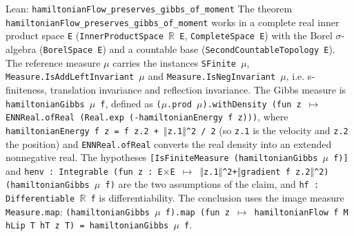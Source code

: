 \documentclass[11pt,a4paper]{article}
\begin{document}
\begin{leanbox}{Lean: \texttt{hamiltonianFlow\_\allowbreak{}preserves\_\allowbreak{}gibbs\_\allowbreak{}of\_\allowbreak{}moment}}
The theorem \texttt{hamiltonian\allowbreak{}Flow\_\allowbreak{}preserves\_\allowbreak{}gibbs\_\allowbreak{}of\_\allowbreak{}moment} works in a complete real inner product space \texttt{E} (\texttt{Inner\allowbreak{}Product\allowbreak{}Space \ensuremath{\mathbb R} E}, \texttt{Complete\allowbreak{}Space E}) with the Borel \ensuremath{\sigma}-algebra (\texttt{Borel\allowbreak{}Space E}) and a countable base (\texttt{Second\allowbreak{}Countable\allowbreak{}Topology E}). The reference measure \texttt{\ensuremath{\mu}} carries the instances \texttt{SFinite \ensuremath{\mu}}, \texttt{Measure.\allowbreak{}Is\allowbreak{}Add\allowbreak{}Left\allowbreak{}Invariant \ensuremath{\mu}} and \texttt{Measure.\allowbreak{}Is\allowbreak{}Neg\allowbreak{}Invariant \ensuremath{\mu}}, i.e. s-finiteness, translation invariance and reflection invariance. The Gibbs measure is \texttt{hamiltonian\allowbreak{}Gibbs \ensuremath{\mu} f}, defined as \texttt{(\ensuremath{\mu}.\allowbreak{}prod \ensuremath{\mu}).\allowbreak{}with\allowbreak{}Density (fun z \ensuremath{\mapsto} ENNReal.\allowbreak{}of\allowbreak{}Real (Real.\allowbreak{}exp (-\allowbreak{}hamiltonian\allowbreak{}Energy f z)))}, where \texttt{hamiltonian\allowbreak{}Energy f z = f z.\allowbreak{}2 + \ensuremath{\Vert}z.\allowbreak{}1\ensuremath{\Vert}\textasciicircum{}2 /\allowbreak{} 2} (so \texttt{z.\allowbreak{}1} is the velocity and \texttt{z.\allowbreak{}2} the position) and \texttt{ENNReal.\allowbreak{}of\allowbreak{}Real} converts the real density into an extended nonnegative real. The hypotheses \texttt{[Is\allowbreak{}Finite\allowbreak{}Measure (hamiltonian\allowbreak{}Gibbs \ensuremath{\mu} f)]} and \texttt{henv : Integrable (fun z : E\ensuremath{\times}E \ensuremath{\mapsto} \ensuremath{\Vert}z.\allowbreak{}1\ensuremath{\Vert}\textasciicircum{}2+\ensuremath{\Vert}gradient f z.\allowbreak{}2\ensuremath{\Vert}\textasciicircum{}2) (hamiltonian\allowbreak{}Gibbs \ensuremath{\mu} f)} are the two assumptions of the claim, and \texttt{hf : Differentiable \ensuremath{\mathbb R} f} is differentiability. The conclusion uses the image measure \texttt{Measure.\allowbreak{}map}: \texttt{(hamiltonian\allowbreak{}Gibbs \ensuremath{\mu} f).\allowbreak{}map (fun z \ensuremath{\mapsto} hamiltonian\allowbreak{}Flow f M h\allowbreak{}Lip T h\allowbreak{}T z T) = hamiltonian\allowbreak{}Gibbs \ensuremath{\mu} f}.



\begin{enumerate}



\end{enumerate}
\end{leanbox}
\end{document}
